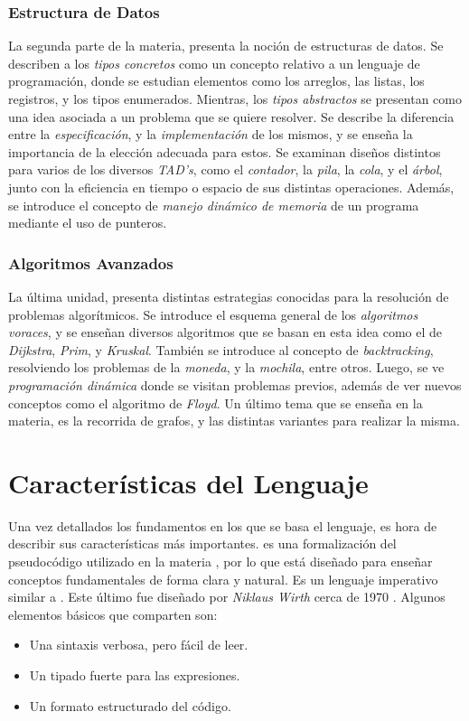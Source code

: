 \subsubsection{Estructura de Datos}

La segunda parte de la materia, presenta la noción de estructuras de datos.
Se describen a los \textit{tipos concretos} como un concepto relativo a un lenguaje de programación, donde se estudian elementos como los arreglos, las listas, los registros, y los tipos enumerados.
Mientras, los \textit{tipos abstractos} se presentan como una idea asociada a un problema que se quiere resolver.
Se describe la diferencia entre la \textit{especificación}, y la \textit{implementación} de los mismos, y se enseña la importancia de la elección adecuada para estos.
Se examinan diseños distintos para varios de los diversos \textit{TAD's}, como el \textit{contador}, la \textit{pila}, la \textit{cola}, y el \textit{árbol}, junto con la eficiencia en tiempo o espacio de sus distintas operaciones.
Además, se introduce el concepto de \textit{manejo dinámico de memoria} de un programa mediante el uso de punteros.

\subsubsection{Algoritmos Avanzados}

La última unidad, presenta distintas estrategias conocidas para la resolución de problemas algorítmicos.
Se introduce el esquema general de los \textit{algoritmos voraces}, y se enseñan diversos algoritmos que se basan en esta idea como el de \textit{Dijkstra}, \textit{Prim}, y \textit{Kruskal}.
También se introduce al concepto de \textit{backtracking}, resolviendo los problemas de la \textit{moneda}, y la \textit{mochila}, entre otros.
Luego, se ve \textit{programación dinámica} donde se visitan problemas previos, además de ver nuevos conceptos como el algoritmo de \textit{Floyd}.
Un último tema que se enseña en la materia, es la recorrida de grafos, y las distintas variantes para realizar la misma.

\section{Características del Lenguaje}

Una vez detallados los fundamentos en los que se basa el lenguaje, es hora de describir sus características más importantes.
\Lenguaje{} es una formalización del pseudocódigo utilizado en la materia \Materia{}, por lo que está diseñado para enseñar conceptos fundamentales de forma clara y natural.
Es un lenguaje imperativo similar a \Pascal{}.
Este último fue diseñado por \textit{Niklaus Wirth} cerca de 1970 \cite{Pascal}.
Algunos elementos básicos que comparten son:
\begin{itemize}
    \item Una sintaxis verbosa, pero fácil de leer.
    \item Un tipado fuerte para las expresiones.
    \item Un formato estructurado del código.
\end{itemize}

